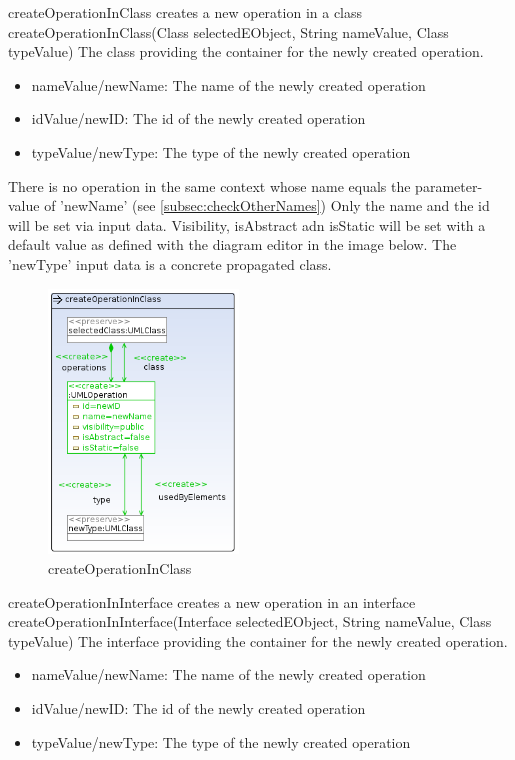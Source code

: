 \op
{createOperationInClass}
{creates a new operation in a class}
{createOperationInClass(Class selectedEObject, String nameValue, Class typeValue)}
{The class providing the container for the newly created operation.} {
\begin{itemize}
 \item nameValue/newName: The name of the newly created operation
 \item idValue/newID: The id of the newly created operation
 \item typeValue/newType: The type of the newly created operation
\end{itemize}
}
{There is no operation in the same context whose name equals the parameter-value
of 'newName' (see
\ref{subsec:checkOtherNames})}
{Only the name and the id will be set via input data. Visibility, isAbstract adn
isStatic will be set with a default value as defined with the diagram editor in
the image below. The 'newType' input data is a concrete propagated class.}
\begin{figure}[H]
  \centering
  \includegraphics[width=0.45\textwidth]{pics/createOperationInClass.png}
  \caption{createOperationInClass}
  \label{createOperationInClass}
\end{figure}
\op
{createOperationInInterface}
{creates a new operation in an interface}
{createOperationInInterface(Interface selectedEObject, String nameValue, Class typeValue)}
{The interface providing the container for the newly created
operation.} {
\begin{itemize}
 \item nameValue/newName: The name of the newly created operation
 \item idValue/newID: The id of the newly created operation
 \item typeValue/newType: The type of the newly created operation
\end{itemize}
}
